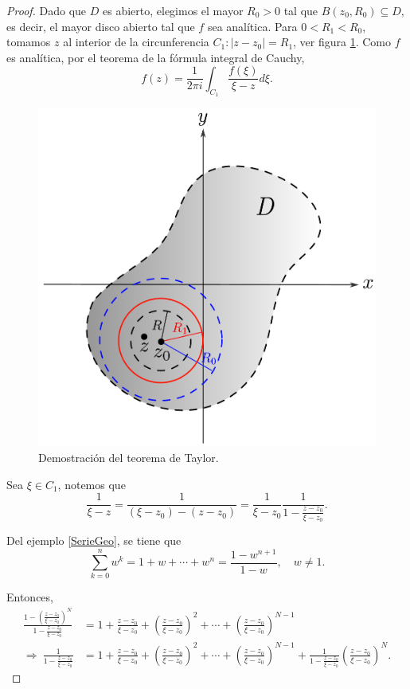\begin{proof}

Dado que $D$ es abierto, elegimos el mayor $R_0 > 0$ tal que $B(z_0,R_0) \subseteq D$, es decir, el mayor disco abierto tal que $f$ sea analítica. Para $0 < R_1 < R_0$, tomamos $z$ al interior de la circunferencia $C_1: |z-z_0| = R_1$, ver figura \ref{fig:Taylor}. Como $f$ es analítica, por el teorema de la fórmula integral de Cauchy, 
$$f(z) = \frac{1}{2\pi i} \int_{C_1} \frac{f(\xi)}{\xi-z} d\xi.$$

\begin{figure}[H]
    \centering
    \includegraphics[scale = 0.55]{Figuras/TeoremaTaylor.pdf}
    \caption{Demostración del teorema de Taylor.}
    \label{fig:Taylor}
\end{figure}

Sea $\xi \in C_1$, notemos que
$$\frac{1}{\xi - z} = \frac{1}{(\xi - z_0) - (z-z_0)} = \frac{1}{\xi - z_0} \frac{1}{1- \frac{z-z_0}{\xi-z_0}}. $$

Del ejemplo \ref{SerieGeo}, se tiene que
$$\sum_{k=0}^n w^k = 1 + w + \cdots + w^n = \frac{1-w^{n+1}}{1-w}, \quad w \neq 1.$$

Entonces,
\begin{align*}
    \frac{1-\left(\frac{z-z_0}{\xi-z_0}\right)^N}{1- \frac{z-z_0}{\xi-z_0}} &= 1 + \frac{z-z_0}{\xi-z_0} + \left(\frac{z-z_0}{\xi-z_0} \right)^2 + \cdots + \left(\frac{z-z_0}{\xi-z_0} \right)^{N-1} \\
    \Rightarrow ~ \frac{1}{1- \frac{z-z_0}{\xi-z_0}}&=  1 + \frac{z-z_0}{\xi-z_0} + \left(\frac{z-z_0}{\xi-z_0} \right)^2 + \cdots + \left(\frac{z-z_0}{\xi-z_0} \right)^{N-1} + \frac{1}{1-\frac{z-z_0}{\xi-z_0}} \left(\frac{z-z_0}{\xi-z_0} \right)^{N}.
\end{align*}


\end{proof}

